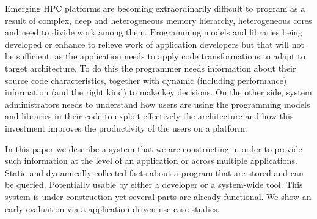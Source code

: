 Emerging HPC platforms are becoming extraordinarily difficult to program as a result of complex, deep  and heterogeneous memory hierarchy, heterogeneous cores and need to divide work among them. 
Programming models and libraries being developed or enhance to relieve work of application developers but that will not be sufficient, as the application needs to apply code transformations to adapt to target architecture. To do this the programmer needs information about their source code characteristics, together with dynamic (including performance) information (and the right kind) to make key decisions.
On the other side, system administrators needs to understand how users are using the programming models and libraries in their code to exploit effectively the architecture and how this investment improves the productivity of the users on a platform.

In this paper we describe a system that we are constructing in order to provide such information at the level of an application or across multiple applications. Static and dynamically collected facts about a program that are stored and can be queried. Potentially usable by either a developer or a system-wide tool. This system is under construction yet several parts are already functional.  We show an early evaluation via a application-driven use-case studies.
